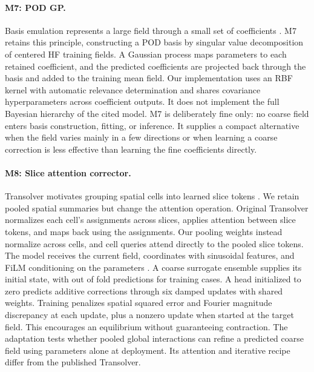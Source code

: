 \paragraph{M7: POD GP.}
Basis emulation represents a large field through a small set of coefficients
\citep{higdon2008}. M7 retains this principle, constructing a POD basis by
singular value decomposition of centered HF training fields. A Gaussian process
maps parameters to each retained coefficient, and the predicted coefficients
are projected back through the basis and added to the training mean field.
Our implementation uses an RBF kernel with automatic relevance determination
and shares covariance hyperparameters across coefficient outputs. It does not
implement the full Bayesian hierarchy of the cited model. M7 is deliberately
fine only: no coarse field enters basis construction, fitting, or inference.
It supplies a compact alternative when the field varies mainly in a few
directions or when learning a coarse correction is less effective than learning
the fine coefficients directly.

\paragraph{M8: Slice attention corrector.}
Transolver motivates grouping spatial cells into learned slice tokens
\citep{wu2024transolver}. We retain pooled spatial summaries but change the
attention operation. Original Transolver normalizes each cell's assignments
across slices, applies attention between slice tokens, and maps back using
the assignments. Our pooling weights instead normalize across cells, and
cell queries attend directly to the pooled slice tokens. The model receives
the current field, coordinates with sinusoidal features, and FiLM conditioning
on the parameters \citep{perez2018}. A coarse surrogate ensemble supplies its
initial state, with out of fold predictions for training cases. A head
initialized to zero predicts additive corrections through six damped updates
with shared weights. Training penalizes spatial squared error and Fourier
magnitude discrepancy at each update, plus a nonzero update when started at
the target field. This encourages an equilibrium without guaranteeing
contraction. The adaptation tests whether pooled global interactions can
refine a predicted coarse field using parameters alone at deployment. Its
attention and iterative recipe differ from the published Transolver.

